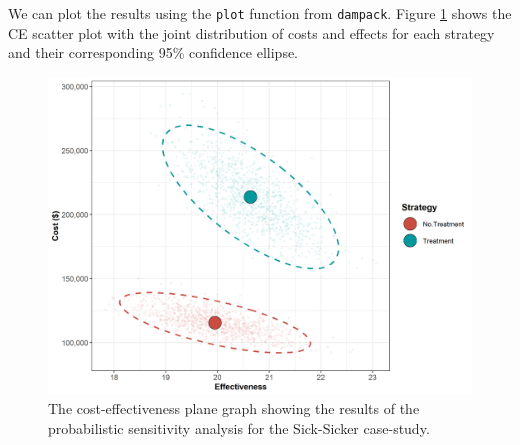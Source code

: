 \documentclass[]{book}
\newenvironment{Shaded}{\begin{snugshade}}{\end{snugshade}}
\newcommand{\CharTok}[1]{\textcolor[rgb]{0.31,0.60,0.02}{#1}}
\newcommand{\CommentTok}[1]{\textcolor[rgb]{0.56,0.35,0.01}{\textit{#1}}}
\newcommand{\ControlFlowTok}[1]{\textcolor[rgb]{0.13,0.29,0.53}{\textbf{#1}}}
\newcommand{\DataTypeTok}[1]{\textcolor[rgb]{0.13,0.29,0.53}{#1}}
\newcommand{\DecValTok}[1]{\textcolor[rgb]{0.00,0.00,0.81}{#1}}
\newcommand{\KeywordTok}[1]{\textcolor[rgb]{0.13,0.29,0.53}{\textbf{#1}}}
\newcommand{\NormalTok}[1]{#1}
\newcommand{\OperatorTok}[1]{\textcolor[rgb]{0.81,0.36,0.00}{\textbf{#1}}}
\newcommand{\StringTok}[1]{\textcolor[rgb]{0.31,0.60,0.02}{#1}}
\begin{document}
\begin{Shaded}
\end{Shaded}

We can plot the results using the \texttt{plot} function from \texttt{dampack}. Figure \ref{fig:05a-CEAplane} shows the CE scatter plot with the joint distribution of costs and effects for each strategy and their corresponding 95\% confidence ellipse.

\begin{figure}

{\centering \includegraphics[width=1\linewidth]{../figs/05a_cea_plane_scatter} 

}

\caption{The cost-effectiveness plane graph showing the results of the probabilistic sensitivity analysis for the Sick-Sicker case-study.}\label{fig:05a-CEAplane}
\end{figure}
\end{document}
